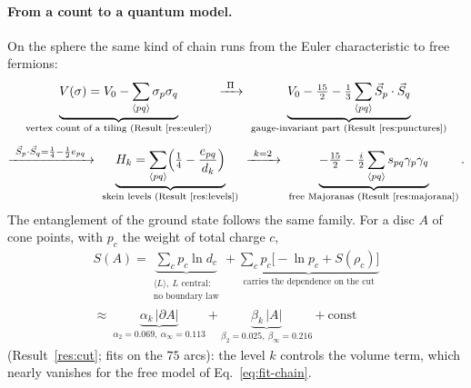 \documentclass[11pt]{article}
\theoremstyle{definition}
\begin{document}
\paragraph{From a count to a quantum model.} On the sphere the same kind of chain runs from the Euler characteristic to free fermions:
\begin{equation}\label{eq:fit-chain}
\begin{gathered}
\underbrace{V(\sigma)=V_0-\sum_{\langle pq\rangle}\sigma_p\sigma_q}_{\text{vertex count of a tiling (Result~\ref{res:euler})}}
\ \xrightarrow{\ \Pi\ }\
\underbrace{V_0-\tfrac{15}2-\tfrac13\sum_{\langle pq\rangle}\vec S_p\cdot\vec S_q}_{\text{gauge-invariant part (Result~\ref{res:punctures})}}\\[4pt]
\xrightarrow{\ \vec S_p\cdot\vec S_q=\frac14-\frac12e_{pq}\ }\
\underbrace{H_k=\sum_{\langle pq\rangle}\Bigl(\tfrac14-\frac{e_{pq}}{d_k}\Bigr)}_{\text{skein levels (Result~\ref{res:levels})}}
\ \xrightarrow{\ k=2\ }\
\underbrace{-\tfrac{15}2-\tfrac i2\sum_{\langle pq\rangle}s_{pq}\gamma_p\gamma_q}_{\text{free Majoranas (Result~\ref{res:majorana})}} .
\end{gathered}
\end{equation}
The entanglement of the ground state follows the same family. For a disc $A$ of cone points, with $p_c$ the weight of total charge $c$,
\begin{equation}\label{eq:fit-entropy}
\begin{gathered}
S(A)=\underbrace{\sum_cp_c\ln d_c}_{\substack{\langle L\rangle,\ L \text{ central:}\\ \text{no boundary law}}}
+\underbrace{\sum_cp_c\bigl[-\ln p_c+S(\rho_c)\bigr]}_{\text{carries the dependence on the cut}}\\[4pt]
\approx\ \underbrace{\alpha_k\,|\partial A|}_{\alpha_2=0.069,\ \alpha_\infty=0.113}+\underbrace{\beta_k\,|A|}_{\beta_2=0.025,\ \beta_\infty=0.216}+\text{const}
\end{gathered}
\end{equation}
(Result~\ref{res:cut}; fits on the $75$ arcs): the level $k$ controls the volume term, which nearly vanishes for the free model of Eq.~\eqref{eq:fit-chain}.



\end{document}
